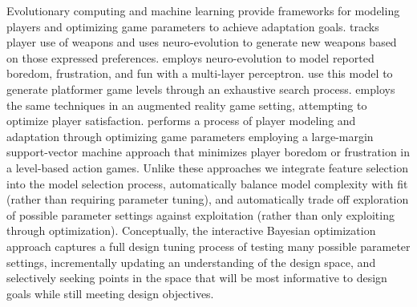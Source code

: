 \documentclass[letterpaper]{article}
\begin{document}



Evolutionary computing and machine learning provide frameworks for modeling players and optimizing game parameters to achieve adaptation goals.
\cite{hastings2009:gar} tracks player use of weapons and uses neuro-evolution to generate new weapons based on those expressed preferences.
\cite{pedersen2009:smb} employs neuro-evolution to model reported boredom, frustration, and fun with a multi-layer perceptron. 
\cite{shaker2010:platformer-gen} use this model to generate platformer game levels through an exhaustive search process. 
\cite{yannakakis2009:playermodel} employs the same techniques in an augmented reality game setting, attempting to optimize player satisfaction.
\cite{yu2011:minboredom} performs a process of player modeling and adaptation through optimizing game parameters employing a large-margin support-vector machine approach that minimizes player boredom or frustration in a level-based action games. 
Unlike these approaches we integrate feature selection into the model selection process, automatically balance model complexity with fit (rather than requiring parameter tuning), and automatically trade off exploration of possible parameter settings against exploitation (rather than only exploiting through optimization). Conceptually, the interactive Bayesian optimization approach captures a full design tuning process of testing many possible parameter settings, incrementally updating an understanding of the design space, and selectively seeking points in the space that will be most informative to design goals while still meeting design objectives.


\end{document}

